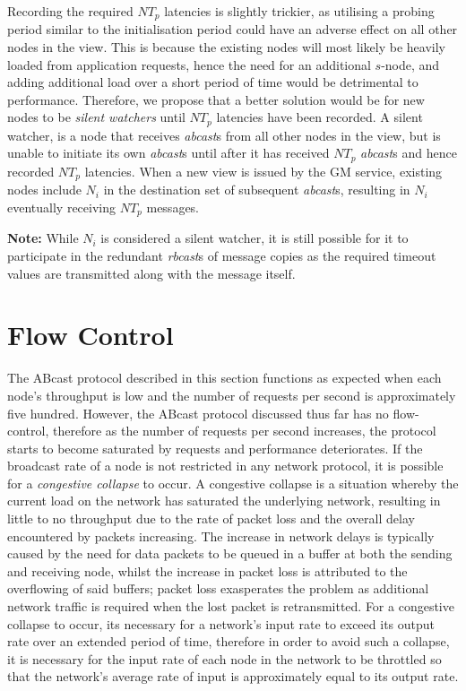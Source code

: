     Recording the required $NT_p$ latencies is slightly trickier, as utilising a probing period similar to the initialisation period could have an adverse effect on all other nodes in the view.  This is because the existing nodes will most likely be heavily loaded from application requests, hence the need for an additional $s$-node, and adding additional load over a short period of time would be detrimental to performance.  Therefore, we propose that a better solution would be for new nodes to be \emph{silent watchers} until $NT_p$ latencies have been recorded.  A silent watcher, is a node that receives \emph{abcast}s from all other nodes in the view, but is unable to initiate its own \emph{abcast}s until after it has received $NT_p$ \emph{abcast}s and hence recorded $NT_p$ latencies.  When a new view is issued by the GM service, existing nodes include $N_i$ in the destination set of subsequent \emph{abcast}s, resulting in $N_i$ eventually receiving $NT_p$ messages.  
    
    \textbf{Note:} While $N_i$ is considered a silent watcher, it is still possible for it to participate in the redundant \emph{rbcast}s of message copies as the required timeout values are transmitted along with the message itself.      

\section{Flow Control}
The \textsf{ABcast} protocol described in this section functions as expected when each node's throughput is low and the number of requests per second is approximately five hundred.  However, the \textsf{ABcast} protocol discussed thus far has no flow-control, therefore as the number of requests per second increases, the protocol starts to become saturated by requests and performance deteriorates.  If the broadcast rate of a node is not restricted in any network protocol, it is possible for a \emph{congestive collapse} \citep{CongestiveCollapse, Jacobson:1988:CAC:52324.52356} to occur.  A congestive collapse is a situation whereby the current load on the network has saturated the underlying network, resulting in little to no throughput due to the rate of packet loss and the overall delay encountered by packets increasing.  The increase in network delays is typically caused by the need for data packets to be queued in a buffer at both the sending and receiving node, whilst the increase in packet loss is attributed to the overflowing of said buffers; packet loss exasperates the problem as additional network traffic is required when the lost packet is retransmitted.  For a congestive collapse to occur, its necessary for a network's input rate to exceed its output rate over an extended period of time, therefore in order to avoid such a collapse, it is necessary for the input rate of each node in the network to be throttled so that the network's average rate of input is approximately equal to its output rate.  

